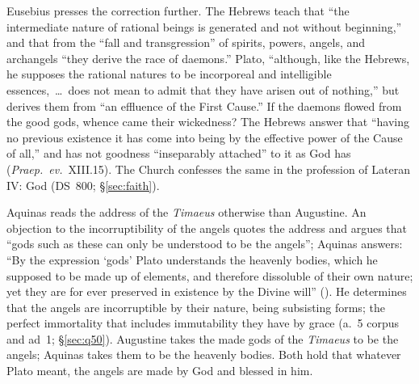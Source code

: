 Eusebius presses the correction further. The Hebrews teach that ``the
intermediate nature of rational beings is generated and not without
beginning,'' and that from the ``fall and transgression'' of spirits,
powers, angels, and archangels ``they derive the race of daemons.''
Plato, ``although, like the Hebrews, he supposes the rational natures
to be incorporeal and intelligible essences,~\dots\ does not mean to
admit that they have arisen out of nothing,'' but derives them from ``an
effluence of the First Cause.'' If the daemons flowed from the good
gods, whence came their wickedness? The Hebrews answer that ``having no
previous existence it has come into being by the effective power of the
Cause of all,'' and has not goodness ``inseparably attached'' to it as
God has (\emph{Praep.\ ev.}\ XIII.15). The
Church confesses the same in the profession of Lateran IV: God  (DS~800;
\S\ref{sec:faith}).

Aquinas reads the address of the \emph{Timaeus} otherwise than
Augustine. An objection to the incorruptibility of the angels quotes the address
and argues that ``gods such as these can only be understood to be the
angels''; Aquinas answers: ``By the expression `gods'
Plato understands the heavenly bodies, which he supposed to be made up of
elements, and therefore dissoluble of their own nature; yet they are for
ever preserved in existence by the Divine will'' (). He determines that the angels are incorruptible by
their nature, being subsisting forms; the perfect immortality that
includes immutability they have by grace (a.~5 corpus and ad~1;
\S\ref{sec:q50}). Augustine takes the made gods of the \emph{Timaeus} to
be the angels; Aquinas takes them to be the heavenly bodies. Both hold
that whatever Plato meant, the angels are made by God and blessed in
him.

